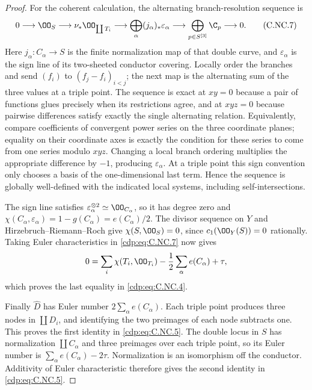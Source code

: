 \begin{proof}
For the coherent calculation, the alternating branch-resolution sequence is
\[
 0\longrightarrow\OO_S\longrightarrow\nu_*\OO_{\coprod T_i}
 \longrightarrow\bigoplus_\alpha(j_\alpha)_*\varepsilon_\alpha
 \longrightarrow\bigoplus_{p\in S^{[3]}}\C_p
 \longrightarrow0.
 \tag{C.NC.7}\label{cdp:eq:C.NC.7}
\]
Here $j_\alpha:C_\alpha\to S$ is the finite normalization map of that double curve, and $\varepsilon_\alpha$ is the sign line of its two-sheeted conductor covering. Locally order the branches and send $(f_i)$ to $(f_j-f_i)_{i<j}$; the next map is the alternating sum of the three values at a triple point. The sequence is exact at $xy=0$ because a pair of functions glues precisely when its restrictions agree, and at $xyz=0$ because pairwise differences satisfy exactly the single alternating relation. Equivalently, compare coefficients of convergent power series on the three coordinate planes; equality on their coordinate axes is exactly the condition for these series to come from one series modulo $xyz$. Changing a local branch ordering multiplies the appropriate difference by $-1$, producing $\varepsilon_\alpha$. At a triple point this sign convention only chooses a basis of the one-dimensional last term. Hence the sequence is globally well-defined with the indicated local systems, including self-intersections.

The sign line satisfies $\varepsilon_\alpha^{\otimes2}\simeq\OO_{C_\alpha}$, so it has degree zero and $\chi(C_\alpha,\varepsilon_\alpha)=1-g(C_\alpha)=e(C_\alpha)/2$. The divisor sequence on $Y$ and Hirzebruch--Riemann--Roch give $\chi(S,\OO_S)=0$, since $c_1(\OO_Y(S))=0$ rationally. Taking Euler characteristics in \eqref{cdp:eq:C.NC.7} now gives
\[
 0=\sum_i\chi(T_i,\OO_{T_i})-\frac12\sum_\alpha e(C_\alpha)+\tau,
\]
which proves the last equality in \eqref{cdp:eq:C.NC.4}.

Finally $\widehat D$ has Euler number $2\sum_\alpha e(C_\alpha)$. Each triple point produces three nodes in $\coprod D_i$, and identifying the two preimages of each node subtracts one. This proves the first identity in \eqref{cdp:eq:C.NC.5}. The double locus in $S$ has normalization $\coprod C_\alpha$ and three preimages over each triple point, so its Euler number is $\sum_\alpha e(C_\alpha)-2\tau$. Normalization is an isomorphism off the conductor. Additivity of Euler characteristic therefore gives the second identity in \eqref{cdp:eq:C.NC.5}.
\end{proof}


